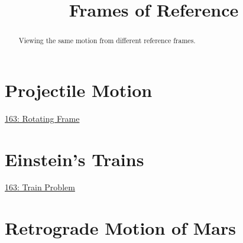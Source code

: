 \documentclass{ximera}
\title{Frames of Reference}
\begin{document}
\begin{abstract}
Viewing the same motion from different reference frames.
\end{abstract}
\maketitle


\section{Projectile Motion}
\begin{question}  \label{Qdsf435r45te}

\begin{onlineOnly}
    \begin{center}
\end{center}
\end{onlineOnly}

\href{https://www.desmos.com/3d/sqvm9cvfyd}{163: Rotating Frame}


\end{question}


\section{Einstein's Trains}

\begin{question}  \label{Qsdfds44445te}

\begin{onlineOnly}
    \begin{center}
\end{center}
\end{onlineOnly}

\href{https://www.desmos.com/calculator/uzywalzuny}{163: Train Problem}


\end{question}


\section{Retrograde Motion of Mars}
\end{document}

